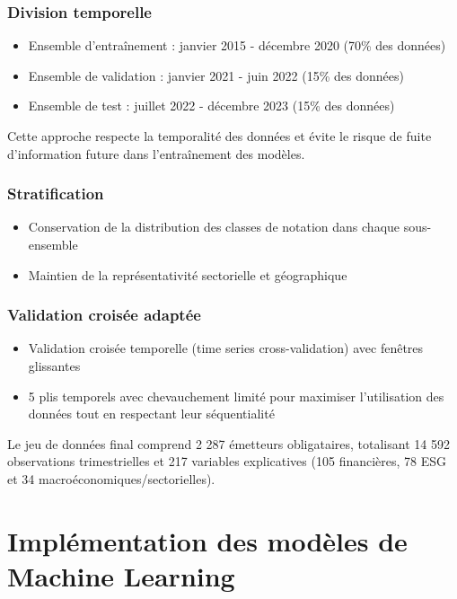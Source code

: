 \subsubsection{Division temporelle}
\begin{itemize}
  \item Ensemble d'entraînement : janvier 2015 - décembre 2020 (70\% des données)
  \item Ensemble de validation : janvier 2021 - juin 2022 (15\% des données)
  \item Ensemble de test : juillet 2022 - décembre 2023 (15\% des données)
\end{itemize}

Cette approche respecte la temporalité des données et évite le risque de fuite d'information future dans l'entraînement des modèles.

\subsubsection{Stratification}
\begin{itemize}
  \item Conservation de la distribution des classes de notation dans chaque sous-ensemble
  \item Maintien de la représentativité sectorielle et géographique
\end{itemize}

\subsubsection{Validation croisée adaptée}
\begin{itemize}
  \item Validation croisée temporelle (time series cross-validation) avec fenêtres glissantes
  \item 5 plis temporels avec chevauchement limité pour maximiser l'utilisation des données tout en respectant leur séquentialité
\end{itemize}

Le jeu de données final comprend 2 287 émetteurs obligataires, totalisant 14 592 observations trimestrielles et 217 variables explicatives (105 financières, 78 ESG et 34 macroéconomiques/sectorielles).

\section{Implémentation des modèles de Machine Learning}

